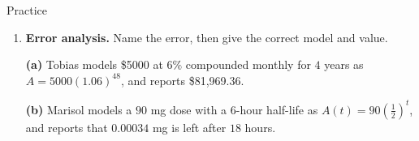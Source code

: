 \documentclass[10pt]{article}
\begin{document}
\begin{notesbox}{Practice}
\begin{enumerate}[leftmargin=1.9em, itemsep=11pt]
\begin{center}
\begin{minipage}[c]{0.52\linewidth}
    \vspace{3pt}
    \textbf{(b)} The money doubles between year  and year .

    \vspace{3pt}
    \textbf{(c)} Write the equation you would have to solve to find the exact doubling time, then
    divide to simplify it. 

    \vspace{3pt}
    \textbf{(d)} Try Step 1 of Lesson 7.3 on it. What stops you? 
    \end{minipage}
    \end{center}

  \item \textbf{Error analysis.} Name the error, then give the correct model and value.

    \vspace{2pt}
    \textbf{(a)} Tobias models \$5000 at $6\%$ compounded monthly for $4$ years as
    $A=5000(1.06)^{48}$, and reports \$81{,}969.36.

    \vspace{2pt}
    \textbf{(b)} Marisol models a $90$ mg dose with a $6$-hour half-life as
    $A(t)=90\left(\frac12\right)^{t}$, and reports that $0.00034$ mg is left after $18$ hours.
\end{enumerate}
\end{notesbox}
\end{document}
